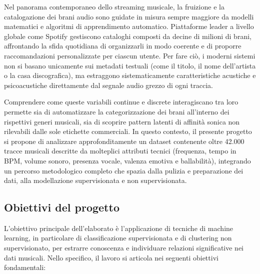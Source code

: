 \documentclass[12pt,a4paper]{article}
\begin{document}
Nel panorama contemporaneo dello streaming musicale, la fruizione e la catalogazione dei brani audio sono guidate in misura sempre maggiore da modelli matematici e algoritmi di apprendimento automatico. Piattaforme leader a livello globale come Spotify gestiscono cataloghi composti da decine di milioni di brani, affrontando la sfida quotidiana di organizzarli in modo coerente e di proporre raccomandazioni personalizzate per ciascun utente. Per fare ciò, i moderni sistemi non si basano unicamente sui metadati testuali (come il titolo, il nome dell'artista o la casa discografica), ma estraggono sistematicamente caratteristiche acustiche e psicoacustiche direttamente dal segnale audio grezzo di ogni traccia.

Comprendere come queste variabili continue e discrete interagiscano tra loro permette sia di automatizzare la categorizzazione dei brani all'interno dei rispettivi generi musicali, sia di scoprire pattern latenti di affinità sonica non rilevabili dalle sole etichette commerciali. In questo contesto, il presente progetto si propone di analizzare approfonditamente un dataset contenente oltre 42.000 tracce musicali descritte da molteplici attributi tecnici (frequenza, tempo in BPM, volume sonoro, presenza vocale, valenza emotiva e ballabilità), integrando un percorso metodologico completo che spazia dalla pulizia e preparazione dei dati, alla modellazione supervisionata e non supervisionata.

\subsection{Obiettivi del progetto}

L'obiettivo principale dell'elaborato è l'applicazione di tecniche di machine learning, in particolare di classificazione supervisionata e di clustering non supervisionato, per estrarre conoscenza e individuare relazioni significative nei dati musicali. Nello specifico, il lavoro si articola nei seguenti obiettivi fondamentali:
\end{document}
